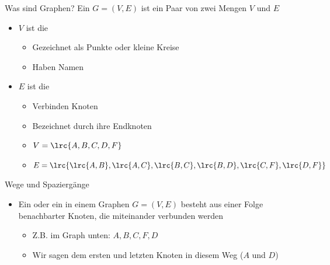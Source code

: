 \begin{frame}{Was sind Graphen?}
    Ein  $G=(V,E)$ ist ein Paar von zwei Mengen $V$ und $E$
    \begin{itemize}[<+->]
        \item $V$ ist die 
        \begin{itemize}
            \item Gezeichnet als Punkte oder kleine Kreise
            \item Haben Namen
        \end{itemize}
        \item $E$ ist die 
        \begin{itemize}
            \item Verbinden Knoten
            \item Bezeichnet durch ihre Endknoten
        \end{itemize}
        \begin{itemize}
            \item $V=\lrc{A,B,C,D,F}$
            \item $E=\lrc{\lrc{A,B},\lrc{A,C},\lrc{B,C},\lrc{B,D},\lrc{C,F},\lrc{D,F}}$
        \end{itemize}
    \end{itemize}

\end{frame}

\begin{frame}{ Wege und Spaziergänge}
    \begin{itemize}
        \item Ein  oder ein  in einem Graphen $G=(V,E)$ besteht aus einer Folge benachbarter Knoten, die miteinander verbunden werden
        \begin{itemize}
            \item Z.B. im Graph unten: $A,B,C,F,D$
            \item Wir sagen dem ersten und letzten Knoten in diesem Weg ($A$ und $D$) 
        \end{itemize}
    \end{itemize}
\end{frame}

